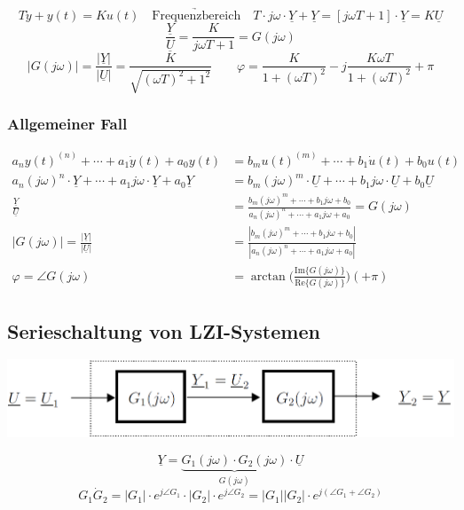 
\vspace{-0.5cm} %
$$ T \dot{y} + y(t) = K u(t) \quad \underrightarrow{\text{Frequenzbereich}} \quad 
T \cdot j \omega \cdot \underline{Y} + \underline{Y} = [j \omega T + 1] \cdot \underline{Y} = K \underline{U} $$
$$ \frac{\underline{Y}}{\underline{U}} = \frac{K}{j \omega T + 1} = G(j \omega) $$
$$ |G(j \omega)| = \frac{|\underline{Y}|}{|\underline{U}|} = \frac{K}{\sqrt{(\omega T)^2 + 1^2}} \qquad \varphi = \frac{K}{1 + (\omega T)^2} - j \frac{K \omega T}{1 + (\omega T)^2 } + \pi $$


\subsubsection{Allgemeiner Fall}


\vspace{-0.5cm} %
\begin{align*}
    a_n y(t)^{(n)} + \cdots  + a_1 \dot{y}(t) + a_0 y(t) &= b_m u(t)^{(m)} + \cdots + b_1 \dot{u}(t) + b_0 u(t) \\
    a_n (j \omega)^n \cdot \underline{Y} + \cdots + a_1 j \omega \cdot \underline{Y} + a_0 \underline{Y} 
    &=  b_m (j \omega)^m \cdot \underline{U} + \cdots + b_1 j \omega \cdot \underline{U} + b_0 \underline{U} \\
    \frac{\underline{Y}}{\underline{U}} 
    &= \frac{b_m (j \omega)^m + \cdots + b_1 j \omega + b_0}{a_n (j \omega)^n + \cdots + a_1 j \omega + a_0} = G(j \omega) \\
    |G(j \omega)| = \frac{|\underline{Y}|}{|\underline{U}|}
    &= \frac{| b_m (j \omega)^m + \cdots + b_1 j \omega + b_0 |}{| a_n (j \omega)^n + \cdots + a_1 j \omega + a_0 |} \\
    \varphi = \angle G(j \omega) &= \arctan \Big( \frac{\mathrm{Im} \{G(j \omega)\}}{\mathrm{Re}\{G(j \omega)\}} \Big) (+ \pi)
\end{align*}




\subsection{Serieschaltung von LZI-Systemen}

\begin{center}
    \includegraphics[width=0.7\columnwidth]{images/frequenzgang_serieschaltung.png}
\end{center}
$$ \boxed{ \underline{Y} = \underbrace{G_1(j \omega) \cdot G_2(j \omega)}_{G(j \omega)} \cdot \underline{U} } $$
$$ G_1 \dot G_2 = |G_1| \cdot e^{j \angle G_1} \cdot |G_2| \cdot e^{j \angle G_2} = |G_1| |G_2| \cdot e^{j (\angle G_1 + \angle G_2)} $$


